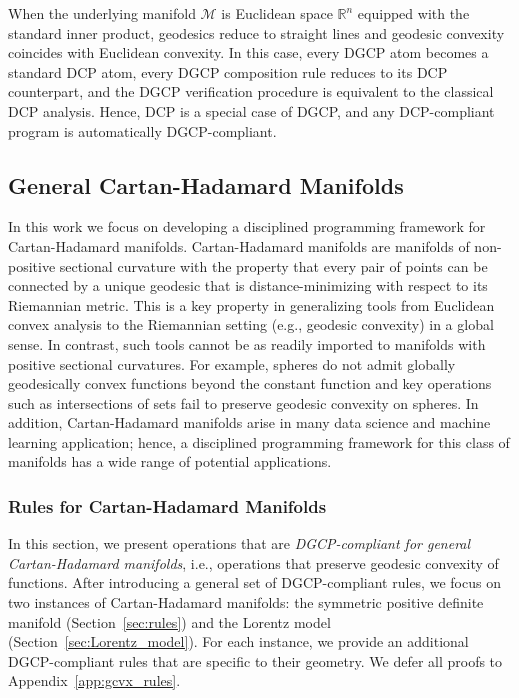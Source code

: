 \documentclass[twoside,11pt]{article}
\begin{document}
\begin{remark}\label{remark:dgcp_reduces_to_dcp}
When the underlying manifold $\mathcal{M}$ is Euclidean space $\mathbb{R}^n$ equipped with the standard inner product, geodesics reduce to straight lines and geodesic convexity coincides with Euclidean convexity. In this case, every DGCP atom becomes a standard DCP atom, every DGCP composition rule reduces to its DCP counterpart, and the DGCP verification procedure is equivalent to the classical DCP analysis. Hence, DCP is a special case of DGCP, and any DCP-compliant program is automatically DGCP-compliant.
\end{remark}





\subsection{General Cartan-Hadamard Manifolds}
In this work we focus on developing a disciplined programming framework for Cartan-Hadamard manifolds.
Cartan-Hadamard manifolds are manifolds of non-positive sectional curvature with the property that every pair of points can be connected by a unique geodesic that is distance-minimizing with respect to its Riemannian metric. This is a key property in generalizing tools from Euclidean convex analysis to the Riemannian setting (e.g., geodesic convexity) in a global sense. In contrast, such tools cannot be as readily imported to manifolds with positive sectional curvatures. For example, spheres do not admit globally geodesically convex functions beyond the constant function and key operations such as intersections of sets fail to preserve geodesic convexity on spheres. In addition, Cartan-Hadamard manifolds arise in many data science and machine learning application; hence, a disciplined programming framework for this class of manifolds has a wide range of potential applications.


\subsubsection{Rules for Cartan-Hadamard Manifolds}
In this section, we present operations that are \emph{DGCP-compliant for general Cartan-Hadamard manifolds}, i.e., operations that preserve geodesic convexity of functions.
After introducing a general set of DGCP-compliant rules, we focus on two instances of Cartan-Hadamard manifolds: the symmetric positive definite manifold (Section~\ref{sec:rules}) and the Lorentz model (Section~\ref{sec:Lorentz_model}). For each instance, we provide an additional DGCP-compliant rules that are specific to their geometry.
We defer all proofs to Appendix~\ref{app:gcvx_rules}.
\end{document}
